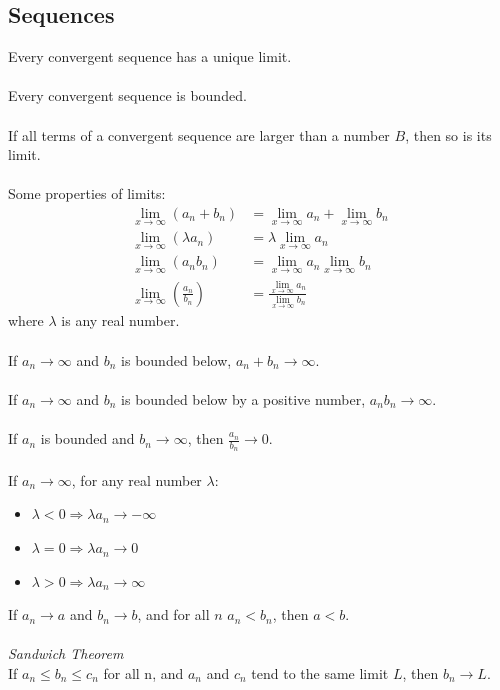 \documentclass{scrartcl}
\begin{document}
\subsection{Sequences}
Every convergent sequence has a unique limit.
\\\\
Every convergent sequence is bounded.
\\\\
If all terms of a convergent sequence are larger than a number $ B $, then so is its limit.
\\\\
Some properties of limits:
\begin{align}
\lim_{x \to \infty}(a_{n} + b_{n}) & = \lim_{x \to \infty} a_{n} + \lim_{x \to \infty} b_{n} \\
\lim_{x \to \infty}(\lambda a_{n}) & = \lambda\lim_{x \to \infty} a_{n} \\
\lim_{x \to \infty}(a_{n}b_{n}) & = \lim_{x \to \infty} a_{n}\lim_{x \to \infty} b_{n} \\
\lim_{x \to \infty}(\frac{a_{n}}{b_{n}}) & = \frac{\lim_{x \to \infty} a_{n}}{\lim_{x \to \infty} b_{n}}
\end{align}
where $ \lambda $ is any real number.
\\\\
If $ a_{n} \to \infty $ and $ b_{n} $ is bounded below, $ a_{n} + b_{n} \to \infty $.
\\\\
If $ a_{n} \to \infty $ and $ b_{n} $ is bounded below by a positive number, $ a_{n}b_{n} \to \infty $.
\\\\
If $ a_{n} $ is bounded and $ b_{n} \to \infty $, then $ \frac{a_{n}}{b_{n}} \to 0 $.
\\\\
If $ a_{n} \to \infty $, for any real number $ \lambda $:
\begin{itemize}
\item $ \lambda < 0 \Rightarrow \lambda a_{n} \to -\infty $
\item $ \lambda = 0 \Rightarrow \lambda a_{n} \to 0 $
\item $ \lambda > 0 \Rightarrow \lambda a_{n} \to \infty $
\end{itemize}
If $ a_{n} \to a $ and $ b_{n} \to b $, and for all $ n $ $ a_{n} < b_{n} $, then $ a < b $.
\\\\
\textit{Sandwich Theorem}
\\
If $ a_{n} \leq b_{n} \leq c_{n} $ for all n, and $ a_{n} $ and $ c_{n} $ tend to the same limit $ L $, then $ b_{n} \to L $.
\end{document}

